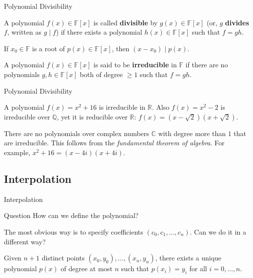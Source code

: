 \documentclass{beamer}
\begin{document}
    \begin{frame}{Polynomial Divisibility}
      \begin{definition}
        A polynomial $f(x) \in \mathbb{F}[x]$ is called \textbf{divisible} by $g(x) \in \mathbb{F}[x]$ (or, $g$ \textbf{divides} $f$, written as $g \mid f$) if there exists a polynomial $h(x) \in \mathbb{F}[x]$ such that $f=gh$.
        \end{definition}
    
    \pause\begin{theorem}
        If $x_0 \in \mathbb{F}$ is a root of $p(x) \in \mathbb{F}[x]$, then $(x-x_0) \mid p(x)$.
    \end{theorem}
    
    \pause\begin{definition}
        A polynomial $f(x) \in \mathbb{F}[x]$ is said to be \textbf{irreducible} in $\mathbb{F}$ if there are no polynomials $g,h \in \mathbb{F}[x]$ both of degree $\geq 1$ such that $f = gh$.
    \end{definition}
    \end{frame}

    \begin{frame}{Polynomial Divisibility}
      \begin{example}
        A polynomial $f(x) = x^2+16$ is irreducible in $\mathbb{R}$. Also $f(x) = x^2-2$ is irreducible over $\mathbb{Q}$, yet it is reducible over $\mathbb{R}$: $f(x) = (x-\sqrt{2})(x+\sqrt{2})$. 
        \end{example}
    
    \pause\begin{example}
        There are no polynomials over complex numbers $\mathbb{C}$ with degree more than $1$ that are irreducible. This follows from the \textit{fundamental theorem of algebra}. For example, $x^2+16 = (x-4i)(x+4i)$.
    \end{example}
    \end{frame}
    \subsection{Interpolation}
    \begin{frame}{Interpolation}
      \begin{alertblock}{Question}
        How can we define the polynomial?
      \end{alertblock}

      The most obvious way is to specify coefficients $(c_0,c_1,\dots,c_n)$. Can we do it in a different way?

      \pause\begin{theorem}
        Given $n+1$ distinct points $(x_0,y_0),\dots,(x_n,y_n)$, there exists a unique polynomial $p(x)$ of degree at most $n$ such that $p(x_i) = y_i$ for all $i=0,\dots,n$.
      \end{theorem}
    \end{frame}
\end{document}
